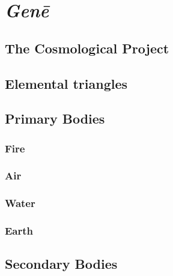 
\chapter{\emph{Genē}} %
\label{cha:gene}

\section{The Cosmological Project} %
\label{sec:the_cosmological_project}


\section{Elemental triangles} %
\label{sec:elemental_triangles}




\section{Primary Bodies} %
\label{sec:primary_bodies}

\subsection{Fire} %
\label{sub:fire}




\subsection{Air} %
\label{sub:air}




\subsection{Water} %
\label{sub:water}




\subsection{Earth} %
\label{sub:earth}





\section{Secondary Bodies} %
\label{sec:secondary_bodies}




